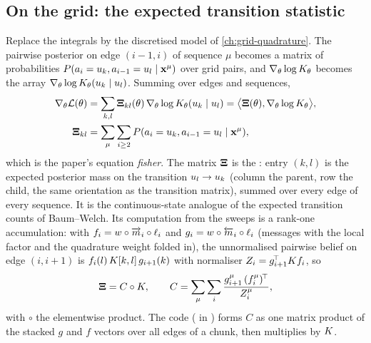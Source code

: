\subsection{On the grid: the expected transition statistic}

Replace the integrals by the discretised model of \cref{ch:grid-quadrature}. The
pairwise posterior on edge $(i-1,i)$ of sequence $\mu$ becomes a matrix of
probabilities $P(a_i=u_{k},a_{i-1}=u_{l}\mid\mathbf{x}^\mu)$ over grid pairs, and
$\nabla_\theta\log K_{\theta}$ becomes the array $\nabla_\theta\log K_{\theta}(u_{k}\mid u_{l})$.
Summing over edges and sequences,
\begin{equation}
\begin{aligned}
  \nabla_\theta\mathcal{L}(\theta)&=\sum_{k,l}\mathbf{\Xi}_{kl}(\theta)\,\nabla_\theta\log K_{\theta}(u_{k}\mid u_{l})
  =\bigl\langle\mathbf{\Xi}(\theta),\nabla_\theta\log K_{\theta}\bigr\rangle,\\
  \mathbf{\Xi}_{kl}&=\sum_\mu\sum_{i\ge2}P(a_i=u_{k},a_{i-1}=u_{l}\mid\mathbf{x}^\mu),
\end{aligned}
  \label{eq:en-fisher-grid}
\end{equation}
which is the paper's equation \emph{fisher}. The matrix $\mathbf{\Xi}$ is the
: entry $(k,l)$ is the expected posterior mass on
the transition $u_{l}\to u_{k}$ (column the parent, row the child, the same
orientation as the transition matrix), summed over every edge of every sequence. It is
the continuous-state analogue of the expected transition counts of Baum--Welch. Its
computation from the sweeps is a rank-one accumulation: with
$f_i=w\circ\overrightarrow{m}_i\circ\ell_i$ and $g_i=w\circ\overleftarrow{m}_i\circ\ell_i$ (messages with the local
factor and the quadrature weight folded in), the unnormalised pairwise belief on edge
$(i,i+1)$ is $f_i(l)\,K[k,l]\,g_{i+1}(k)$ with normaliser $Z_i=g_{i+1}^{\!\top}K f_i$, so
\begin{equation}
  \mathbf{\Xi}=C\circ K,\qquad C=\sum_{\mu}\sum_{i}\frac{g^\mu_{i+1}\,(f^\mu_i)^{\!\top}}{Z^\mu_i},
  \label{eq:en-xi-accum}
\end{equation}
with $\circ$ the elementwise product. The code ( in
) forms $C$ as one matrix product of the stacked
$g$ and $f$ vectors over all edges of a chunk, then multiplies by $K$.


